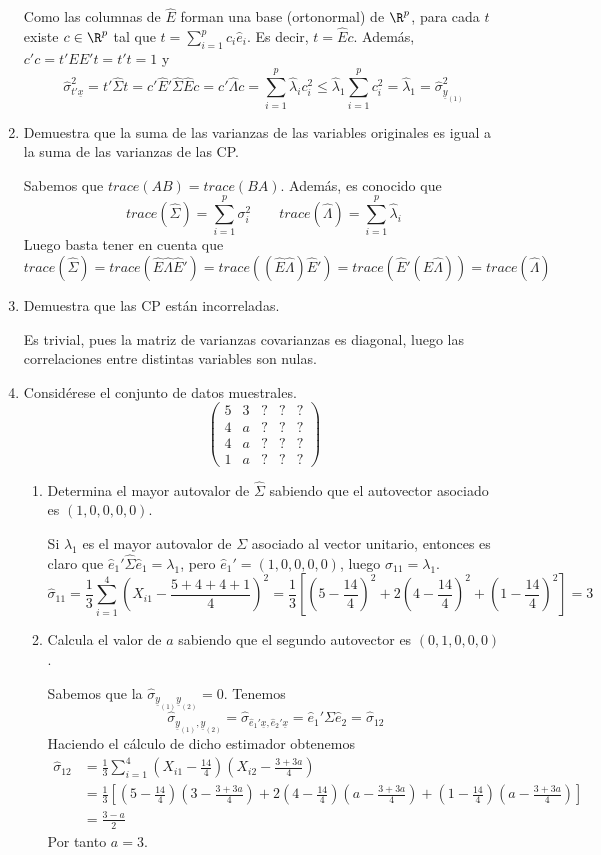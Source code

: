 \documentclass[twoside]{article}
\newcommand{\muestra}[1]{{\underline{#1}}}
\begin{document}
\begin{enumerate}
Como las columnas de $\hat{E}$ forman una base (ortonormal) de $\R^p$, para cada $t$ existe $c\in \R^p$ tal que $t = \sum_{i=1}^p c_i \hat{e}_i$. Es decir, $t=\hat{E}c$. Además, $c'c = t'EE't=t't=1$ y
$$
\hat{\sigma}^2_{t'\muestra{x}} = t'\hat{\Sigma}t =  c'\hat{E}'\hat{\Sigma}\hat{E}c = c'\hat{\Lambda}c = \sum_{i=1}^p \hat{\lambda}_i c_i^2 \leq \hat{\lambda}_1 \sum_{i=1}^p  c_i^2 = \hat{\lambda}_1 = \hat{\sigma}^2_{\muestra{y}_{(1)}}
$$
\item Demuestra que la suma de las varianzas de las variables originales es igual a la suma de las varianzas de las CP.

Sabemos que $trace(AB)=trace(BA)$. Además, es conocido que 
$$
trace(\hat{\Sigma}) = \sum_{i=1}^p \sigma_i^2 \qquad trace(\hat{\Lambda}) = \sum_{i=1}^p \hat{\lambda}_i
$$
Luego basta tener en cuenta que
$$
trace(\hat{\Sigma})=trace(\hat{E}\hat{\Lambda}\hat{E}')=trace((\hat{E}\hat{\Lambda})\hat{E}') = trace(\hat{E}'(\hat{E}\hat{\Lambda})) = trace(\hat{\Lambda})
$$
\item Demuestra que las CP están incorreladas.

Es trivial, pues la matriz de varianzas covarianzas es diagonal, luego las correlaciones entre distintas variables son nulas.
\item Considérese el conjunto de datos muestrales.
\[ \begin{pmatrix}5 & 3 & ? & ? & ?\\4 & a & ? & ? & ?\\4 & a & ? & ? & ?\\1 & a & ? & ? & ?\end{pmatrix}\]
\begin{enumerate}
	\item Determina el mayor autovalor de $\widehat{\Sigma}$ sabiendo que el autovector asociado es $(1,0,0,0,0)$.
	
Si $\lambda_1$ es el mayor autovalor de $\Sigma$ asociado al vector unitario, entonces es claro que $\hat{e}_1'\hat{\Sigma}\hat{e}_1=\lambda_1$, pero $\hat{e}_1' = (1,0,0,0,0)$, luego $\hat{\sigma}_{11} = \lambda_1$.
$$
\hat{\sigma}_{11}=\frac{1}{3}\sum_{i=1}^4(X_{i1}-\frac{5+4+4+1}{4})^2 = \frac{1}{3}\left[(5-\frac{14}{4})^2 +  2(4-\frac{14}{4})^2 + (1-\frac{14}{4})^2\right]= 3
$$

	\item Calcula el valor de $a$ sabiendo que el segundo autovector es $(0,1,0,0,0)$. 
	
Sabemos que la $\hat{\sigma}_{\muestra{y}_{(1)}\muestra{y}_{(2)}}=0$. Tenemos
$$
\hat{\sigma}_{\muestra{y}_{(1)},\muestra{y}_{(2)}} = \hat{\sigma}_{\hat{e}_1'\muestra{x},\hat{e}_2'\muestra{x}} = \hat{e}_1'\Sigma \hat{e}_2 = \hat{\sigma}_{12}
$$
Haciendo el cálculo de dicho estimador obtenemos
\begin{align*}
\hat{\sigma}_{12}&=\frac{1}{3}\sum_{i=1}^4(X_{i1}-\frac{14}{4})(X_{i2}-\frac{3+3a}{4})\\
&=\frac{1}{3}\left[(5-\frac{14}{4})(3-\frac{3+3a}{4})+2(4-\frac{14}{4})(a-\frac{3+3a}{4})+(1-\frac{14}{4})(a-\frac{3+3a}{4})\right]\\
&=\frac{3-a}{2}
\end{align*}
Por tanto $a=3$.


\end{enumerate}
\end{enumerate}
\end{document}
